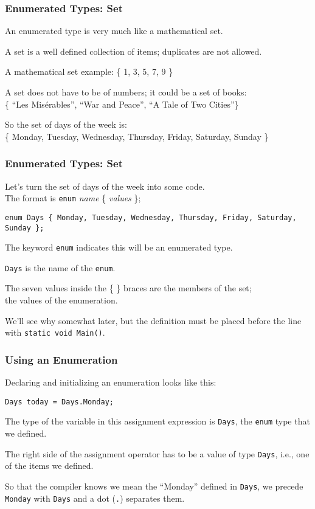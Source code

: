 \begin{frame}
\frametitle{Enumerated Types: Set}

An enumerated type is very much like a mathematical \alert{set}.

A set is a well defined collection of items; duplicates are not allowed.

A mathematical set example: \{ 1, 3, 5, 7, 9 \}

A set does not have to be of numbers; it could be a set of books:\\ \{ ``Les Mis\'{e}rables'', ``War and Peace'', ``A Tale of Two Cities''\}

So the set of days of the week is:\\
\{ Monday, Tuesday, Wednesday, Thursday, Friday, Saturday, Sunday \}

\end{frame}

\begin{frame}
\frametitle{Enumerated Types: Set}

Let's turn the set of days of the week into some code.\\
\quad The format is \texttt{enum} \textit{name} \{ \textit{values} \};

\texttt{enum Days \{ Monday, Tuesday, Wednesday, Thursday, Friday, Saturday, Sunday \};}

The keyword \texttt{enum} indicates this will be an enumerated type.

\texttt{Days} is the name of the \texttt{enum}.

The seven values inside the \{ \} braces are the members of the set;\\
\quad the values of the enumeration.

We'll see why somewhat later, but the definition must be placed before the line with \texttt{static void Main()}.

\end{frame}

\begin{frame}
\frametitle{Using an Enumeration}

Declaring and initializing an enumeration looks like this:

\texttt{Days today = Days.Monday;}

The type of the variable in this assignment expression is \texttt{Days}, the \texttt{enum} type that we defined.

The right side of the assignment operator has to be a value of type \texttt{Days}, i.e., one of the items we defined.

So that the compiler knows we mean the ``Monday'' defined in \texttt{Days}, we precede \texttt{Monday} with \texttt{Days} and a dot (\texttt{.}) separates them.

\end{frame}


